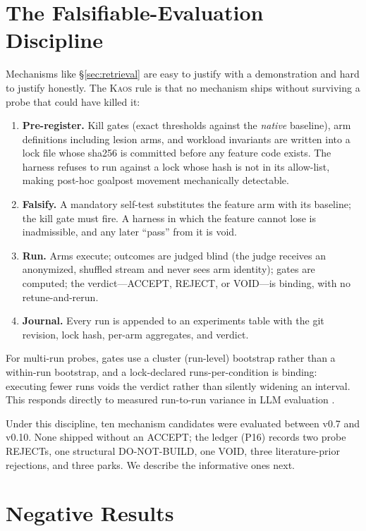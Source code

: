 \documentclass[11pt]{article}
\newcommand{\kaos}{\textsc{Kaos}}
\begin{document}
\section{The Falsifiable-Evaluation Discipline}
\label{sec:discipline}

Mechanisms like \S\ref{sec:retrieval} are easy to justify with a demonstration and hard to justify honestly. The \kaos{} rule is that no mechanism ships without surviving a probe that could have killed it:

\begin{enumerate}
  \item \textbf{Pre-register.} Kill gates (exact thresholds against the \emph{native} baseline), arm definitions including lesion arms, and workload invariants are written into a lock file whose sha256 is committed before any feature code exists. The harness refuses to run against a lock whose hash is not in its allow-list, making post-hoc goalpost movement mechanically detectable.
  \item \textbf{Falsify.} A mandatory self-test substitutes the feature arm with its baseline; the kill gate must fire. A harness in which the feature cannot lose is inadmissible, and any later ``pass'' from it is void.
  \item \textbf{Run.} Arms execute; outcomes are judged blind (the judge receives an anonymized, shuffled stream and never sees arm identity); gates are computed; the verdict---ACCEPT, REJECT, or VOID---is binding, with no retune-and-rerun.
  \item \textbf{Journal.} Every run is appended to an experiments table with the git revision, lock hash, per-arm aggregates, and verdict.
\end{enumerate}

For multi-run probes, gates use a cluster (run-level) bootstrap rather than a within-run bootstrap, and a lock-declared runs-per-condition is binding: executing fewer runs voids the verdict rather than silently widening an interval. This responds directly to measured run-to-run variance in LLM evaluation \citep{multirun2026}.

Under this discipline, ten mechanism candidates were evaluated between v0.7 and v0.10. None shipped without an ACCEPT; the ledger (P16) records two probe REJECTs, one structural DO-NOT-BUILD, one VOID, three literature-prior rejections, and three parks. We describe the informative ones next.

\section{Negative Results}
\label{sec:negative}
\end{document}
